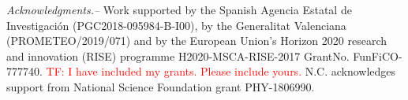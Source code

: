 \documentclass[aps, twocolumn, superscriptaddress, showpacs, nofootinbib, longbibliography]{revtex4-1}
\newcommand{\tf}[1]{\textcolor{red}{TF: #1}}
\begin{document}
\begin{abstract}
  
\end{abstract}

\maketitle

\bigskip

\bigskip

\bigskip

\bigskip

\bigskip


\bigskip\noindent\textit{Acknowledgments.--} Work supported by the Spanish Agencia Estatal de Investigaci\'on (PGC2018-095984-B-I00), by the Generalitat Valenciana (PROMETEO/2019/071)
and by  the European Union’s Horizon 2020 research and innovation (RISE)  programme   H2020-MSCA-RISE-2017  GrantNo.  FunFiCO-777740.  \tf{I have included my grants. Please include yours.}
N.C. acknowledges support from National Science Foundation grant PHY-1806990.

\begin{appendices}

\end{appendices}
%

\end{document}
